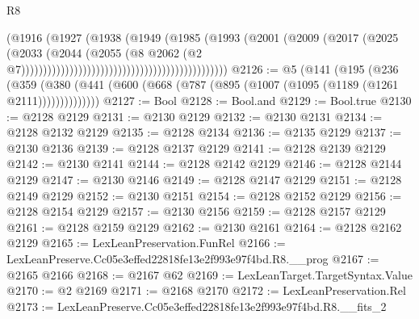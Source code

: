 \begin{lexlean}{R8}
\begin{coremodule}
                                                                    (@1916
                                                                      (@1927
                                                                        (@1938
                                                                          (@1949
                                                                            (@1985
                                                                              (@1993
                                                                                (@2001
                                                                                  (@2009
                                                                                    (@2017
                                                                                      (@2025
                                                                                        (@2033
                                                                                          (@2044
                                                                                            (@2055
                                                                                              (@8
                                                                                                @2062
                                                                                                (@2
                                                                                                  @7)))))))))))))))))))))))))))))))))))))))))))))))
@2126 := @5
    (@141
      (@195
        (@236
          (@359 (@380 (@441 (@600 (@668 (@787 (@895 (@1007 (@1095 (@1189 (@1261 @2111))))))))))))))
@2127 := Bool
@2128 := Bool.and
@2129 := Bool.true
@2130 := @2128 @2129
@2131 := @2130 @2129
@2132 := @2130 @2131
@2134 := @2128 @2132 @2129
@2135 := @2128 @2134
@2136 := @2135 @2129
@2137 := @2130 @2136
@2139 := @2128 @2137 @2129
@2141 := @2128 @2139 @2129
@2142 := @2130 @2141
@2144 := @2128 @2142 @2129
@2146 := @2128 @2144 @2129
@2147 := @2130 @2146
@2149 := @2128 @2147 @2129
@2151 := @2128 @2149 @2129
@2152 := @2130 @2151
@2154 := @2128 @2152 @2129
@2156 := @2128 @2154 @2129
@2157 := @2130 @2156
@2159 := @2128 @2157 @2129
@2161 := @2128 @2159 @2129
@2162 := @2130 @2161
@2164 := @2128 @2162 @2129
@2165 := LexLeanPreservation.FunRel
@2166 := LexLeanPreserve.Cc05e3effed22818fe13e2f993e97f4bd.R8.__prog
@2167 := @2165 @2166
@2168 := @2167 @62
@2169 := LexLeanTarget.TargetSyntax.Value
@2170 := @2 @2169
@2171 := @2168 @2170
@2172 := LexLeanPreservation.Rel
@2173 := LexLeanPreserve.Cc05e3effed22818fe13e2f993e97f4bd.R8.__fits_2

\end{coremodule}
\end{lexlean}

